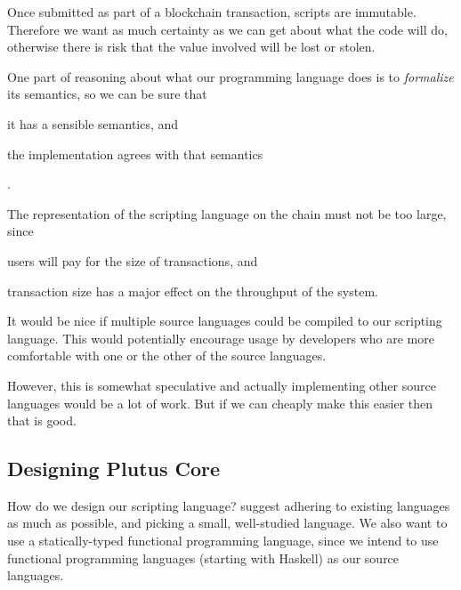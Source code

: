 \begin{requirement}[Safety]
\label{req:script-lang-reasoning}
Once submitted as part of a blockchain transaction, scripts are immutable.
Therefore we want as much certainty as we can get about what the code will do, otherwise there is risk that the value involved will be lost or stolen.
\end{requirement}

\begin{requirement}[Formalization]
\label{req:script-lang-formalization}
One part of reasoning about what our programming language does is to \emph{formalize} its semantics, so we can be sure that
\begin{inparaenum}
  \item it has a sensible semantics, and
  \item the implementation agrees with that semantics
\end{inparaenum}.
\end{requirement}

\begin{requirement}[Size]
\label{req:script-lang-size}
The representation of the scripting language on the chain must not be too large, since
\begin{inparaenum}
\item users will pay for the size of transactions, and
\item transaction size has a major effect on the throughput of the system.
\end{inparaenum}
\end{requirement}

\begin{requirement}
\label{req:source-lang-multiple}
It would be nice if multiple source languages could be compiled to our scripting language.
This would potentially encourage usage by developers who are more comfortable with one or the other of the source languages.

However, this is somewhat speculative and actually implementing other source languages would be a lot of work.
But if we can cheaply make this easier then that is good.
\end{requirement}

\subsection{Designing Plutus Core}

How do we design our scripting language?
 suggest adhering to existing languages as much as possible, and picking a small, well-studied language.
We also want to use a statically-typed functional programming language, since we intend to use functional programming languages (starting with Haskell) as our source languages.


